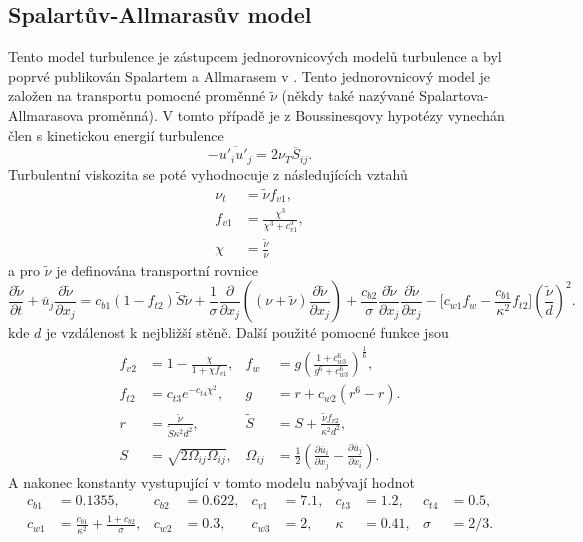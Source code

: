 \subsection{Spalartův-Allmarasův model}
Tento model turbulence je zástupcem jednorovnicových modelů turbulence a byl poprvé publikován Spalartem a Allmarasem v \cite{spalart1992one}. Tento jednorovnicový model je založen na transportu pomocné proměnné $\widetilde{\nu}$ (někdy také nazývané Spalartova-Allmarasova proměnná). V tomto případě je z Boussinesqovy hypotézy vynechán člen s kinetickou energií turbulence
\begin{equation}
-\overline{u'_i u'_j} = 2\nu_T \overline{S}_{ij}.
\end{equation}
Turbulentní viskozita se poté vyhodnocuje z následujících vztahů
\begin{align}
\nu_t &= \widetilde{\nu}f_{v1},\\
f_{v1} &= \frac{\chi^3}{\chi^3 + c^3_{v1}},\\
\chi &= \frac{\widetilde{\nu}}{\nu}
\end{align}
a pro $\widetilde{\nu}$ je definována transportní rovnice
\begin{equation}
\frac{\partial \widetilde{\nu}}{\partial t} + \overline{u}_j\frac{\partial \widetilde{\nu}}{\partial x_j} = c_{b1}(1-f_{t2})\widetilde{S}\widetilde{\nu} + \frac{1}{\sigma}\frac{\partial}{\partial x_j}\left((\nu + \widetilde{\nu})\frac{\partial \widetilde{\nu}}{\partial x_j} \right) + \frac{c_{b2}}{\sigma}\frac{\partial \widetilde{\nu}}{\partial x_j}\frac{\partial \widetilde{\nu}}{\partial x_j} - \bigg[c_{w1}f_{w}-\frac{c_{b1}}{\kappa^2}f_{t2}\bigg]\left( \frac{\widetilde{\nu}}{d} \right)^2.
\end{equation}
kde $ d $ je vzdálenost k nejbližší stěně. Další použité pomocné funkce jsou
\begin{align*}
f_{v2} &= 1 - \frac{\chi}{1+\chi f_{v1}},   &f_{w} &= g \left( \frac{1+c_{w3}^6}{g^6 + c_{w3}^6} \right)^{\frac{1}{6}}, \\
f_{t2} &= c_{t3}e^{-c_{t4}\chi^2},   &g &= r + c_{w2}(r^6 - r).\\
r &= \frac{\widetilde{\nu}}{\widetilde{S}\kappa^2d^2},  &\widetilde{S} &= S + \frac{\widetilde{\nu}f_{v2}}{\kappa^2 d^2}, \\ 
S &= \sqrt{2\Omega_{ij}\Omega_{ij}}, &\Omega_{ij} &= \frac{1}{2}\left( \frac{\partial \overline{u}_i}{\partial x_j} - \frac{\partial \overline{u}_j}{\partial x_i} \right).
\end{align*}
A nakonec konstanty vystupující v tomto modelu nabývají hodnot 
\begin{align*}
c_{b1} &= 0.1355,  &c_{b2} &= 0.622,  &c_{v1} &= 7.1,  &c_{t3} &= 1.2, &c_{t4} &= 0.5,\\
c_{w1} &= \frac{c_{b1}}{\kappa^2} + \frac{1+c_{b2}}{\sigma},  &c_{w2} &= 0.3,  &c_{w3} &= 2,  &\kappa &= 0.41,  &\sigma &= 2/3.
\end{align*}

